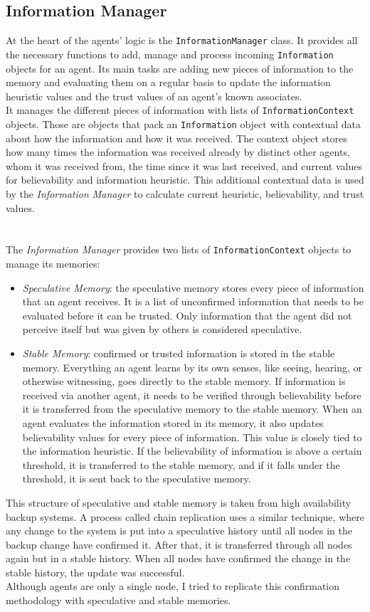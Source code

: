 \subsection{Information Manager}
At the heart of the agents' logic is the \verb|InformationManager| class. It provides all the necessary functions to add, manage and process incoming \verb|Information| objects for an agent. Its main tasks are adding new pieces of information to the memory and evaluating them on a regular basis to update the information heuristic values and the trust values of an agent's known associates.\\
It manages the different pieces of information with lists of \verb|InformationContext| objects. Those are objects that pack an \verb|Information| object with contextual data about how the information and how it was received. The context object stores how many times the information was received already by distinct other agents, whom it was received from, the time since it was last received, and current values for believability and information heuristic. This additional contextual data is used by the \textit{Information Manager} to calculate current heuristic, believability, and trust values.\\
\\\\
The \textit{Information Manager} provides two lists of \verb|InformationContext| objects to manage its memories:
\begin{itemize}
	\item \textit{Speculative Memory}: the speculative memory stores every piece of information that an agent receives. It is a list of unconfirmed information that needs to be evaluated before it can be trusted. Only information that the agent did not perceive itself but was given by others is considered speculative.
	\item \textit{Stable Memory}: confirmed or trusted information is stored in the stable memory. Everything an agent learns by its own senses, like seeing, hearing, or otherwise witnessing, goes directly to the stable memory. If information is received via another agent, it needs to be verified through believability before it is transferred from the speculative memory to the stable memory. When an agent evaluates the information stored in its memory, it also updates believability values for every piece of information. This value is closely tied to the information heuristic. If the believability of information is above a certain threshold, it is transferred to the stable memory, and if it falls under the threshold, it is sent back to the speculative memory.
\end{itemize}
This structure of speculative and stable memory is taken from high availability backup systems. A process called chain replication uses a similar technique, where any change to the system is put into a speculative history until all nodes in the backup change have confirmed it. After that, it is transferred through all nodes again but in a stable history. When all nodes have confirmed the change in the stable history, the update was successful.~\cite{Van2004}\\
Although agents are only a single node, I tried to replicate this confirmation methodology with speculative and stable memories.
